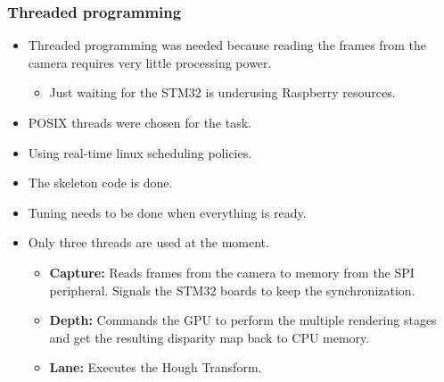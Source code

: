 
\subsubsection{Threaded programming}
\begin{itemize}
	\item Threaded programming was needed because reading the frames from the camera requires very little processing power.
	\begin{itemize}
		\item Just waiting for the STM32 is underusing Raspberry resources.
	\end{itemize}
	\item POSIX threads were chosen for the task.
	\item Using real-time linux scheduling policies.
	\item The skeleton code is done.
	\item Tuning needs to be done when everything is ready.
	\item Only three threads are used at the moment.
	\begin{itemize}
		\item \textbf{Capture:} Reads frames from the camera to memory from the SPI peripheral. Signals the STM32 boards to keep the synchronization.
		\item \textbf{Depth:} Commands the GPU to perform the multiple rendering stages and get the resulting disparity map back to CPU memory.
		\item \textbf{Lane:} Executes the Hough Transform.
	\end{itemize}
\end{itemize}
